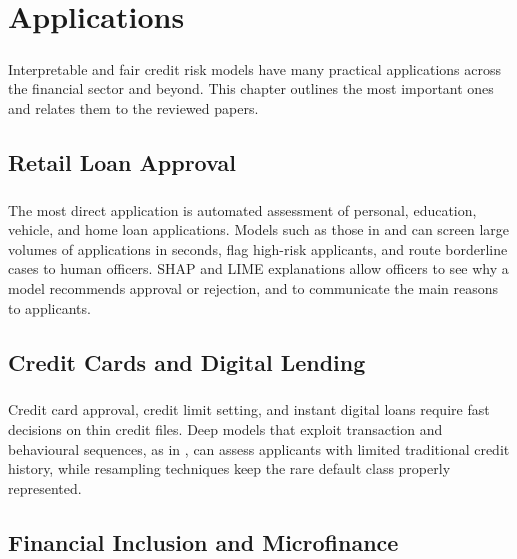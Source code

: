\documentclass[12pt,a4paper,final]{extreport}
\begin{document}
\chapter{Applications}

\paragraph{} Interpretable and fair credit risk models have many practical applications across the financial sector and beyond. This chapter outlines the most important ones and relates them to the reviewed papers.

\section{Retail Loan Approval}

\paragraph{} The most direct application is automated assessment of personal, education, vehicle, and home loan applications. Models such as those in \cite{p2} and \cite{p3} can screen large volumes of applications in seconds, flag high-risk applicants, and route borderline cases to human officers. SHAP and LIME explanations allow officers to see why a model recommends approval or rejection, and to communicate the main reasons to applicants.

\section{Credit Cards and Digital Lending}

\paragraph{} Credit card approval, credit limit setting, and instant digital loans require fast decisions on thin credit files. Deep models that exploit transaction and behavioural sequences, as in \cite{p1}, can assess applicants with limited traditional credit history, while resampling techniques keep the rare default class properly represented.

\section{Financial Inclusion and Microfinance}
\end{document}
